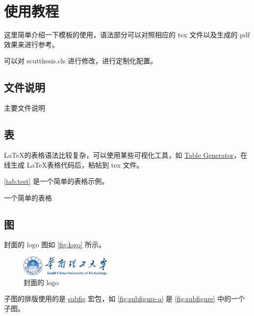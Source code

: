 \chapter{使用教程}

这里简单介绍一下模板的使用，语法部分可以对照相应的 tex 文件以及生成的 pdf 效果来进行参考。

可以对 scutthesis.cls 进行修改，进行定制化配置。

\section{文件说明}

\begin{table}[H]
    \centering
    \caption{主要文件说明}
    \label{tab:file-description}
    
\end{table}

\section{表}

\LaTeX 的表格语法比较复杂，可以使用某些可视化工具，如 \href{https://www.tablesgenerator.com/}{Table Generator}，在线生成 \LaTeX 表格代码后，粘帖到 tex 文件。

\autoref{tab:test} 是一个简单的表格示例。

\begin{table}[H]
    \centering
    \caption{一个简单的表格}
    \label{tab:test}
    
\end{table}

\section{图}

封面的 logo 图如 \autoref{fig:logo} 所示。

\begin{figure}[H]
    \centering
    \caption{封面的 logo}
    \label{fig:logo}
    \includegraphics[width=0.4\textwidth]{img/logo.png}
\end{figure}

子图的排版使用的是 \href{https://www.ctan.org/pkg/subfig}{subfig} 宏包，如 \autoref{fig:subfigure-a} 是 \autoref{fig:subfigure} 中的一个子图。

